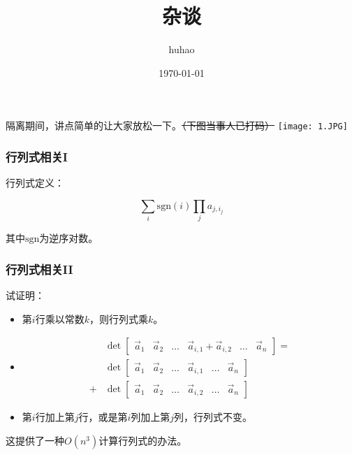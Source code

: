 \documentclass[10pt]{beamer}
\begin{document}
	\title{杂谈}
	\date{\today}
	\author{huhao}
	\maketitle
	\clearpage
	\begin{frame}
	
		隔离期间，讲点简单的让大家放松一下。\sout{（下图当事人已打码）}
		\texttt{[image: 1.JPG]}

	\end{frame}
	\begin{frame}
		\frametitle{行列式相关I}

		行列式定义：

		$$
		\sum_i \mathrm{sgn}(i)\prod_j a_{j,i_j}
		$$

		其中$\mathrm{sgn}$为逆序对数。

	\end{frame}
	\begin{frame}
		\frametitle{行列式相关II}
	
		试证明：

		\begin{itemize}
			\item 第$i$行乘以常数$k$，则行列式乘$k$。
			\item
			$$
			\begin{aligned}
			&\det\begin{bmatrix}\vec a_1&\vec a_2&\dots&\vec a_{i,1}+\vec a_{i,2}&\dots&\vec a_n\end{bmatrix}=\\
			&\det\begin{bmatrix}\vec a_1&\vec a_2&\dots&\vec a_{i,1}&\dots&\vec a_n\end{bmatrix}\\
			+&\det\begin{bmatrix}\vec a_1&\vec a_2&\dots&\vec a_{i,2}&\dots&\vec a_n\end{bmatrix}
			\end{aligned}
			$$
			\item 第$i$行加上第$j$行，或是第$i$列加上第$j$列，行列式不变。
		\end{itemize}

		这提供了一种$O(n^3)$计算行列式的办法。
	
	\end{frame}
\end{document}
